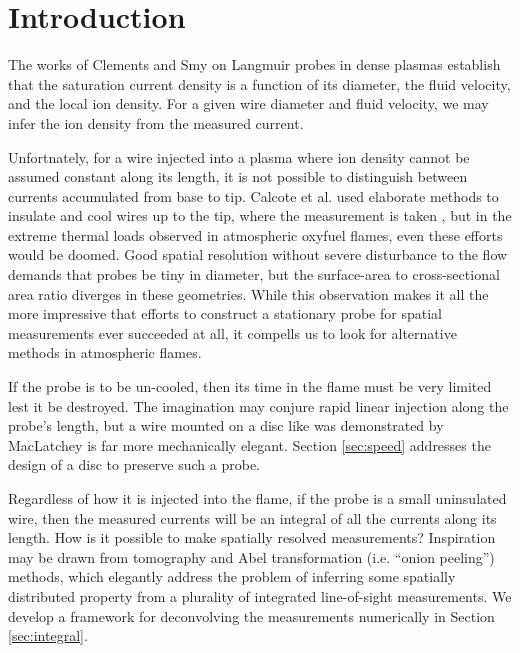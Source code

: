 \section{Introduction}\label{sec:intro}

The works of Clements and Smy on Langmuir probes in dense plasmas \cite{} establish that the saturation current density is a function of its diameter, the fluid velocity, and the local ion density.  For a given wire diameter and fluid velocity, we may infer the ion density from the measured current.

Unfortnately, for a wire injected into a plasma where ion density cannot be assumed constant along its length, it is not possible to distinguish between currents accumulated from base to tip.  Calcote et al. used elaborate methods to insulate and cool wires up to the tip, where the measurement is taken \cite{}, but in the extreme thermal loads observed in atmospheric oxyfuel flames, even these efforts would be doomed.  Good spatial resolution without severe disturbance to the flow demands that probes be tiny in diameter, but the surface-area to cross-sectional area ratio diverges in these geometries.  While this observation makes it all the more impressive that efforts to construct a stationary probe for spatial measurements ever succeeded at all, it compells us to look for alternative methods in atmospheric flames.

If the probe is to be un-cooled, then its time in the flame must be very limited lest it be destroyed.  The imagination may conjure rapid linear injection along the probe's length, but a wire mounted on a disc like was demonstrated by MacLatchey \cite{} is far more mechanically elegant.  Section \ref{sec:speed} addresses the design of a disc to preserve such a probe.

Regardless of how it is injected into the flame, if the probe is a small uninsulated wire, then the measured currents will be an integral of all the currents along its length.  How is it possible to make spatially resolved measurements?  Inspiration may be drawn from tomography and Abel transformation (i.e. ``onion peeling'') methods, which elegantly address the problem of inferring some spatially distributed property from a plurality of integrated line-of-sight measurements.  We develop a framework for deconvolving the measurements numerically in Section \ref{sec:integral}.
